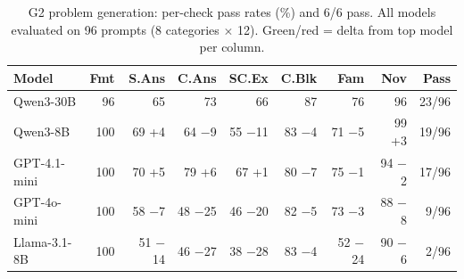 \begin{table}[t]
\centering
\small
\caption{G2 problem generation: per-check pass rates (\%) and 6/6 pass. All models evaluated on 96 prompts (8 categories $\times$ 12). \textcolor{green!60!black}{Green}/\textcolor{red!70!black}{red} = delta from top model per column.}
\label{tab:generate}
\setlength{\tabcolsep}{3pt}
\begin{tabular}{l r rrrrrr r}
\toprule
Model & Fmt & S.Ans & C.Ans & SC.Ex & C.Blk & Fam & Nov & Pass \\
\midrule
Qwen3-30B    & 96 & 65 & 73 & 66 & 87 & 76 & 96 & 23/96 \\
Qwen3-8B     & 100 & 69 \textcolor{green!60!black}{\scriptsize+4} & 64 \textcolor{red!70!black}{\scriptsize$-$9} & 55 \textcolor{red!70!black}{\scriptsize$-$11} & 83 \textcolor{red!70!black}{\scriptsize$-$4} & 71 \textcolor{red!70!black}{\scriptsize$-$5} & 99 \textcolor{green!60!black}{\scriptsize+3} & 19/96 \\
GPT-4.1-mini & 100 & 70 \textcolor{green!60!black}{\scriptsize+5} & 79 \textcolor{green!60!black}{\scriptsize+6} & 67 \textcolor{green!60!black}{\scriptsize+1} & 80 \textcolor{red!70!black}{\scriptsize$-$7} & 75 \textcolor{red!70!black}{\scriptsize$-$1} & 94 \textcolor{red!70!black}{\scriptsize$-$2} & 17/96 \\
GPT-4o-mini  & 100 & 58 \textcolor{red!70!black}{\scriptsize$-$7} & 48 \textcolor{red!70!black}{\scriptsize$-$25} & 46 \textcolor{red!70!black}{\scriptsize$-$20} & 82 \textcolor{red!70!black}{\scriptsize$-$5} & 73 \textcolor{red!70!black}{\scriptsize$-$3} & 88 \textcolor{red!70!black}{\scriptsize$-$8} & 9/96 \\
Llama-3.1-8B & 100 & 51 \textcolor{red!70!black}{\scriptsize$-$14} & 46 \textcolor{red!70!black}{\scriptsize$-$27} & 38 \textcolor{red!70!black}{\scriptsize$-$28} & 83 \textcolor{red!70!black}{\scriptsize$-$4} & 52 \textcolor{red!70!black}{\scriptsize$-$24} & 90 \textcolor{red!70!black}{\scriptsize$-$6} & 2/96 \\
\bottomrule
\end{tabular}
\end{table}
